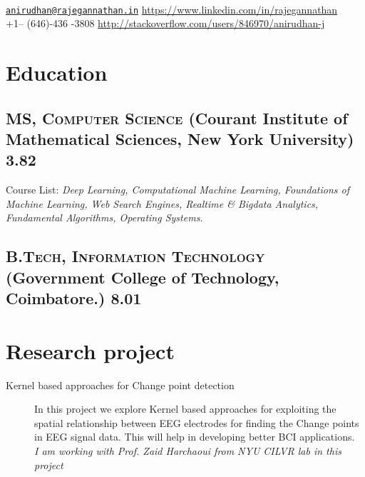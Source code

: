 \documentclass{resume}
\begin{document}
\\
{\href{mailto:anirudhan@rajegannathan.in}{\nolinkurl{anirudhan@rajegannathan.in}} \hfill \href{https://www.linkedin.com/in/rajegannathan}{https://www.linkedin.com/in/rajegannathan}}\\
{+1-- (646)-436 -3808 \hfill \href{http://stackoverflow.com/users/846970/anirudhan-j}{http://stackoverflow.com/users/846970/anirudhan-j}}

\section{Education}
\subsection[MS, Computer Science]{\textsc{MS, Computer Science}    \small{(Courant Institute of Mathematical Sciences, New York University)} \hfill \textbf{3.82}}%
  \begin{description}
    \item{Course List:} \small{\textit{Deep Learning, Computational Machine Learning, Foundations of Machine Learning, Web Search Engines, Realtime \& Bigdata Analytics, Fundamental Algorithms, Operating Systems.}}
  \end{description}
\subsection[B.Tech, Information Technology]{\textsc{B.Tech, Information Technology}    \small{(Government College of Technology, Coimbatore.)} \hfill 8.01}%

\section{Research project}
  \begin{description}
    \item[Kernel based approaches for Change point detection]  In this project we explore Kernel based approaches for exploiting the spatial relationship between EEG electrodes for finding the Change points in EEG signal data.  This will help in developing better BCI applications.\\
      \textit{I am working with Prof\@. Zaid Harchaoui from NYU CILVR lab in this project}
  \end{description}
\end{document}
